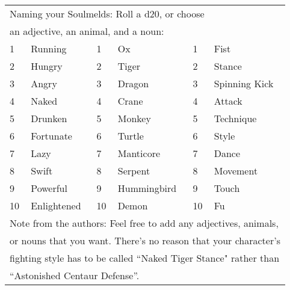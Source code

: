 \begin{table}[tbh]
\begin{small}
\begin{center}
\noindent \begin{tabular}{|ll||ll||ll|}
\multicolumn{6}{l}{Naming your Soulmelds: Roll a d20, or choose}\\
\multicolumn{6}{l}{an adjective, an animal, and a noun:} \\
\hline 1&Running&1&Ox&1&Fist\\
2&Hungry&2&Tiger&2&Stance\\
3&Angry&3&Dragon&3&Spinning Kick\\
4&Naked&4&Crane&4&Attack\\
5&Drunken&5&Monkey&5&Technique\\
6&Fortunate&6&Turtle&6&Style\\
7&Lazy&7&Manticore&7&Dance\\
8&Swift&8&Serpent&8&Movement\\
9&Powerful&9&Hummingbird&9&Touch\\
10&Enlightened&10&Demon&10&Fu\\ \hline
\multicolumn{6}{l}{Note from the authors: Feel free to add any adjectives, animals,}\\
\multicolumn{6}{l}{or nouns that you want.  There's no reason that your character's}\\
\multicolumn{6}{l}{fighting style has to be called ``Naked Tiger Stance" rather than}\\
\multicolumn{6}{l}{``Astonished Centaur Defense''.}\\
\end{tabular}
\end{center}
\end{small}
\end{table}



